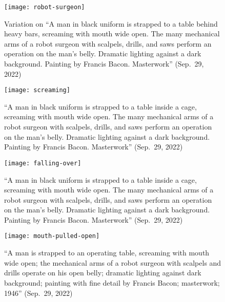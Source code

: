 \begin{figure}[H]
\centering
\begin{minipage}[t]{0.48\textwidth}
    \centering
    \texttt{[image: robot-surgeon]}
    \caption{Variation on ``A man in black uniform is strapped to a table behind
        heavy bars, screaming with mouth wide open. The many mechanical arms of
        a robot surgeon with scalpels, drills, and saws perform an operation on
        the man's belly. Dramatic lighting against a dark background. Painting
        by Francis Bacon. Masterwork'' (Sep.\ 29, 2022)}
\end{minipage}
\hfill
\begin{minipage}[t]{0.48\textwidth}
    \centering
    \texttt{[image: screaming]}
    \caption{``A man in black uniform is strapped to a table inside a cage,
        screaming with mouth wide open. The many mechanical arms of a robot
        surgeon with scalpels, drills, and saws perform an operation on the
        man's belly. Dramatic lighting against a dark background. Painting by
        Francis Bacon. Masterwork'' (Sep.\ 29, 2022)}
\end{minipage}
\end{figure}

\begin{figure}[h!]
\begin{minipage}[t]{0.48\textwidth}
    \centering
    \vspace{1.5em}
    \texttt{[image: falling-over]}
    \caption{``A man in black uniform is strapped to a table inside a cage,
        screaming with mouth wide open. The many mechanical arms of a robot
        surgeon with scalpels, drills, and saws perform an operation on the
        man's belly. Dramatic lighting against a dark background. Painting by
        Francis Bacon. Masterwork'' (Sep.\ 29, 2022)}
\end{minipage}
\hfill
\begin{minipage}[t]{0.48\textwidth}
    \centering
    \vspace{1.5em}
    \texttt{[image: mouth-pulled-open]}
    \caption{``A man is strapped to an operating table, screaming with mouth
        wide open; the mechanical arms of a robot surgeon with scalpels and
        drills operate on his open belly; dramatic lighting against dark
        background; painting with fine detail by Francis Bacon; masterwork;
        1946'' (Sep.\ 29, 2022)}
\end{minipage}
\end{figure}

